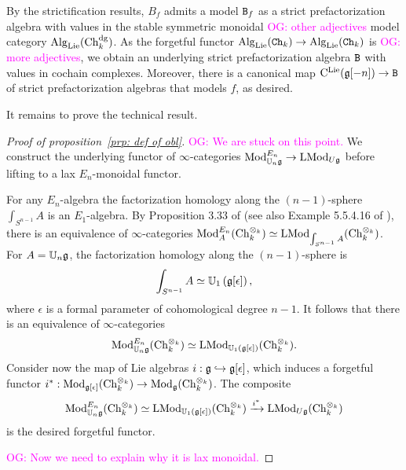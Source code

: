 \documentclass[11pt]{amsart}
\numberwithin{equation}{section}
\def\owen{\textcolor{magenta}{OG: }\textcolor{magenta}}
\begin{document}
\begin{rmk}
By the strictification results, $B_f$ admits a model ${\tt B}_f$ as a strict prefactorization algebra with values in the stable symmetric monoidal \owen{other adjectives} model category ${\rm Alg}_{\rm Lie}({\rm Ch}_k^{\rm dg})$.
As the forgetful functor ${\rm Alg}_{\rm Lie}({\tt Ch}_k) \to {\rm Alg}_{\rm Lie}({\tt Ch}_k)$ is \owen{more adjectives},
we obtain an underlying strict prefactorization algebra ${\tt B}$ with values in cochain complexes.
Moreover, there is a canonical map ${\rm C}^{\rm Lie}(\mathfrak g[-n]) \to {\tt B}$ of strict prefactorization algebras that models $f$, as desired.
\end{rmk}

It remains to prove the technical result.

\begin{proof}[Proof of proposition~\ref{prp: def of obl}]
\owen{We are stuck on this point.}
We construct the underlying functor of $\infty$-categories ${\rm Mod}^{E_n}_{\mathbb U_n \mathfrak g} \to {\rm LMod}_{U\mathfrak g}$ 
before lifting to a lax $E_n$-monoidal functor.

For any $E_n$-algebra the factorization homology along the $(n-1)$-sphere $\int_{S^{n-1}} A$ is an $E_1$-algebra.
By Proposition 3.33 of \cite{FrancisHH} (see also Example 5.5.4.16 of \cite{LurieHA}), 
there is an equivalence of $\infty$-categories ${\rm Mod}^{E_n}_A ({\rm Ch}_k^{\otimes_k}) \simeq {\rm LMod}_{\int_{S^{n-1}} A} ({\rm Ch}_k^{\otimes_k})$.
For $A = \mathbb U_n \mathfrak g$, the factorization homology along the $(n-1)$-sphere is 
\[
\int_{S^{n-1}} A \simeq \mathbb U_1 \left(\mathfrak g[\epsilon] \right),
\] 
where $\epsilon$ is a formal parameter of cohomological degree $n-1$.
It follows that there is an equivalence of $\infty$-categories 
\[
{\rm Mod}_{\mathbb U_n \mathfrak g}^{E_n} ({\rm Ch}_k^{\otimes_k}) \simeq {\rm LMod}_{\mathbb U_1(\mathfrak g[\epsilon])} ({\rm Ch}_k^{\otimes_k}).
\]
Consider now the map of Lie algebras $i : \mathfrak g \hookrightarrow \mathfrak g[\epsilon]$,
which induces a forgetful functor $i^* :  {\rm Mod}_{\mathfrak g[\epsilon]} ({\rm Ch}_k^{\otimes_k})  \to  {\rm Mod}_{\mathfrak g} ({\rm Ch}_k^{\otimes_k})$. 
The composite 
\[
{\rm Mod}_{\mathbb U_n \mathfrak g}^{E_n} ({\rm Ch}_k^{\otimes_k}) \simeq {\rm LMod}_{\mathbb U_1(\mathfrak g[\epsilon])} ({\rm Ch}_k^{\otimes_k}) \xrightarrow{i^*}  {\rm LMod}_{U\mathfrak g} ({\rm Ch}_k^{\otimes_k})
\]
is the desired forgetful functor.

\owen{Now we need to explain why it is lax monoidal.}
\end{proof}
\end{document}
